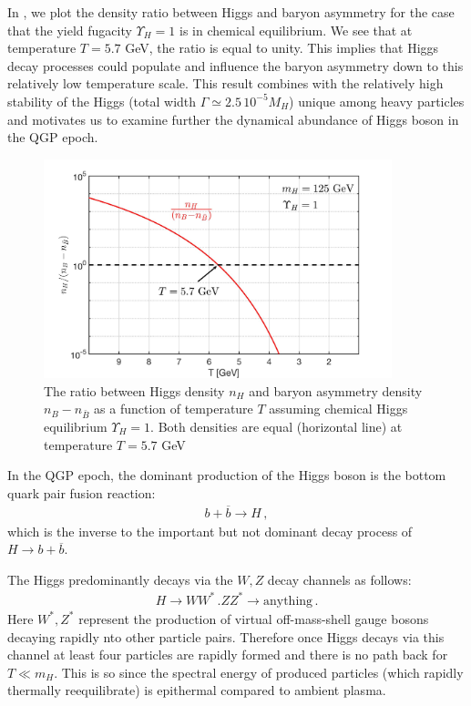 In , we plot the density ratio between Higgs and baryon asymmetry for the case that the yield fugacity $\Upsilon_H=1$ is in chemical equilibrium. We see that at temperature $T=5.7$ GeV, the ratio is equal to unity. This implies that Higgs decay processes could populate and influence the baryon asymmetry down to this relatively low temperature scale.  This result combines with the relatively high stability of the Higgs  (total width $\Gamma\simeq 2.5\,10^{-5}M_H$) unique among heavy particles and motivates us to examine further the dynamical abundance of Higgs boson in the QGP epoch.

\begin{figure}
\centerline{\includegraphics[width=0.9\textwidth]{./plots/HiggsDensityRatio}}
\caption{The ratio between Higgs  density  $n_H$ and baryon asymmetry  density $n_B-n_{\bar B}$ as a function of temperature $T$ assuming chemical Higgs equilibrium $\Upsilon_H=1$. Both densities are equal (horizontal line) at temperature $T=5.7$ GeV}
\label{HiggsDensity_fig} 
\end{figure}

In the QGP epoch, the dominant production of the Higgs boson is the bottom quark pair fusion reaction: 
\begin{align}
b+\overline{b}\longrightarrow H\,,
\end{align}
which is the inverse to the important but not dominant decay process of $H\to b+\overline{b}$.

The Higgs predominantly decays via the $W,Z$ decay channels as follows:
\begin{align}
H\longrightarrow WW^\ast\,. ZZ^\ast\longrightarrow\mathrm{anything}\,.
\end{align}
Here $W^\ast,Z^\ast$ represent the production of virtual off-mass-shell gauge bosons decaying rapidly nto  other particle pairs.  Therefore once Higgs decays via this channel at least four particles are rapidly formed and there is no path back for $T\ll m_H$. This is so since the spectral energy of produced particles (which rapidly thermally reequilibrate) is epithermal compared to ambient plasma. 

